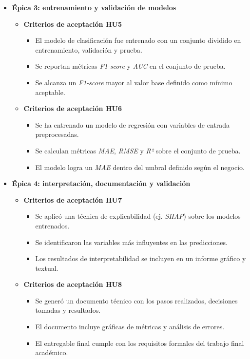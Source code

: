 \documentclass[
11pt, %
]{charter}
\begin{document}
\begin{itemize}
  \item \textbf{Épica 3: entrenamiento y validación de modelos}
    \begin{itemize}
      \item \textbf{Criterios de aceptación HU5}
      \begin{itemize}
        \item El modelo de clasificación fue entrenado con un conjunto dividido en entrenamiento, validación y prueba.
        \item Se reportan métricas \textit{F1-score} y \textit{AUC} en el conjunto de prueba.
        \item Se alcanza un \textit{F1-score} mayor al valor base definido como mínimo aceptable.
      \end{itemize}
      \item \textbf{Criterios de aceptación HU6}
      \begin{itemize}
        \item Se ha entrenado un modelo de regresión con variables de entrada preprocesadas.
        \item Se calculan métricas \textit{MAE}, \textit{RMSE} y \textit{R²} sobre el conjunto de prueba.
        \item El modelo logra un \textit{MAE} dentro del umbral definido según el negocio.
      \end{itemize}
    \end{itemize}

  \item \textbf{Épica 4: interpretación, documentación y validación}
    \begin{itemize}
      \item \textbf{Criterios de aceptación HU7}
      \begin{itemize}
        \item Se aplicó una técnica de explicabilidad (ej. \textit{SHAP}) sobre los modelos entrenados.
        \item Se identificaron las variables más influyentes en las predicciones.
        \item Los resultados de interpretabilidad se incluyen en un informe gráfico y textual.
      \end{itemize}
      \item \textbf{Criterios de aceptación HU8}
      \begin{itemize}
        \item Se generó un documento técnico con los pasos realizados, decisiones tomadas y resultados.
        \item El documento incluye gráficas de métricas y análisis de errores.
        \item El entregable final cumple con los requisitos formales del trabajo final académico.
      \end{itemize}
    \end{itemize}
\end{itemize}
\end{document}
